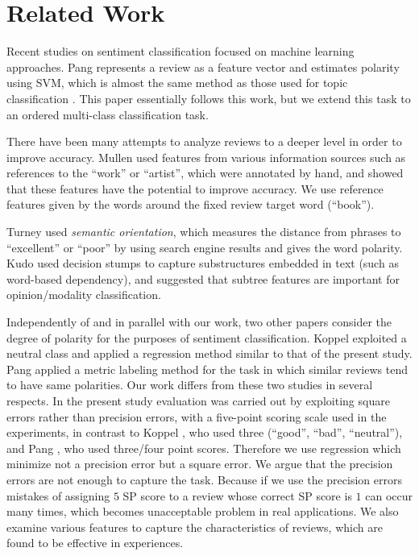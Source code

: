\documentclass[japanese]{jnlp_1.3d}
\begin{document}
\section{Related Work}
\label{Related Work}
Recent studies on sentiment classification focused on machine learning approaches. Pang \cite{Pang2002} represents a review as a feature vector and estimates polarity using SVM, which is almost the same method as those used for topic classification \cite{JoachimsBook}. This paper essentially follows this work, but we extend this task to an ordered multi-class classification task. 

There have been many attempts to analyze reviews to a deeper level in order to improve accuracy. Mullen \cite{Mullen2004_a} used features from various information sources such as references to the ``work'' or ``artist'', which were annotated by hand, and showed that these features have the potential to improve  accuracy. We use reference features given by the words around the fixed review target word (``book'').   

 Turney \cite{Turny2002} used \textit{semantic orientation}, which measures the distance from phrases to ``excellent'' or ``poor'' by using search engine results and gives the word polarity. Kudo \cite{Kudo2004} used decision stumps to capture substructures embedded in text (such as word-based dependency), and suggested that subtree features are important for opinion/modality classification. 
 
 Independently of and in parallel with our work, two other papers consider the degree of polarity for the purposes of sentiment classification. Koppel \cite{Koppel2005} exploited a neutral class and applied a regression method similar to that of the present study. Pang \cite{Pang2005} applied a metric labeling method for the task in which similar reviews tend to have same polarities. Our work differs from these two studies in several respects. In the present study evaluation was carried out by exploiting square errors rather than precision errors, with a five-point scoring scale used in the experiments, in contrast to Koppel \cite{Koppel2005}, who used three (``good'', ``bad'', ``neutral''), and Pang \cite{Pang2005}, who used three/four point scores. Therefore we use regression which minimize not a precision error but a square error.  We argue that the precision errors are not enough to capture the task. Because if we use the precision errors mistakes of assigning $5$ SP score to a review whose correct SP score is $1$ can occur many times, which becomes unacceptable problem in real applications. We also examine various features to capture the characteristics of reviews, which are found to be effective in experiences.
\end{document}
